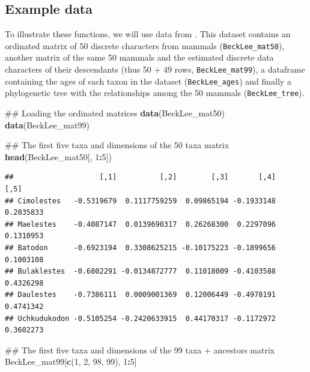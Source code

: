 \documentclass[]{book}
\newenvironment{Shaded}{\begin{snugshade}}{\end{snugshade}}
\newcommand{\KeywordTok}[1]{\textcolor[rgb]{0.13,0.29,0.53}{\textbf{#1}}}
\newcommand{\DecValTok}[1]{\textcolor[rgb]{0.00,0.00,0.81}{#1}}
\newcommand{\OperatorTok}[1]{\textcolor[rgb]{0.81,0.36,0.00}{\textbf{#1}}}
\newcommand{\NormalTok}[1]{#1}
\theoremstyle{definition}
\theoremstyle{definition}
\theoremstyle{remark}
\begin{document}
\hypertarget{example-data}{\subsection{Example
data}\label{example-data}}

To illustrate these functions, we will use data from
\citet{beckancient2014}. This dataset contains an ordinated matrix of 50
discrete characters from mammals (\texttt{BeckLee\_mat50}), another
matrix of the same 50 mammals and the estimated discrete data characters
of their descendants (thus 50 + 49 rows, \texttt{BeckLee\_mat99}), a
dataframe containing the ages of each taxon in the dataset
(\texttt{BeckLee\_ages}) and finally a phylogenetic tree with the
relationships among the 50 mammals (\texttt{BeckLee\_tree}).

\begin{Shaded}
\begin{Highlighting}[]
\NormalTok{## Loading the ordinated matrices}
\KeywordTok{data}\NormalTok{(BeckLee_mat50)}
\KeywordTok{data}\NormalTok{(BeckLee_mat99)}

\NormalTok{## The first five taxa and dimensions of the 50 taxa matrix}
\KeywordTok{head}\NormalTok{(BeckLee_mat50[, }\DecValTok{1}\OperatorTok{:}\DecValTok{5}\NormalTok{])}
\end{Highlighting}
\end{Shaded}

\begin{verbatim}
##                    [,1]          [,2]        [,3]       [,4]      [,5]
## Cimolestes   -0.5319679  0.1117759259  0.09865194 -0.1933148 0.2035833
## Maelestes    -0.4087147  0.0139690317  0.26268300  0.2297096 0.1310953
## Batodon      -0.6923194  0.3308625215 -0.10175223 -0.1899656 0.1003108
## Bulaklestes  -0.6802291 -0.0134872777  0.11018009 -0.4103588 0.4326298
## Daulestes    -0.7386111  0.0009001369  0.12006449 -0.4978191 0.4741342
## Uchkudukodon -0.5105254 -0.2420633915  0.44170317 -0.1172972 0.3602273
\end{verbatim}

\begin{Shaded}
\begin{Highlighting}[]
\NormalTok{## The first five taxa and dimensions of the 99 taxa + ancestors matrix}
\NormalTok{BeckLee_mat99[}\KeywordTok{c}\NormalTok{(}\DecValTok{1}\NormalTok{, }\DecValTok{2}\NormalTok{, }\DecValTok{98}\NormalTok{, }\DecValTok{99}\NormalTok{), }\DecValTok{1}\OperatorTok{:}\DecValTok{5}\NormalTok{]}
\end{Highlighting}
\end{Shaded}
\end{document}
